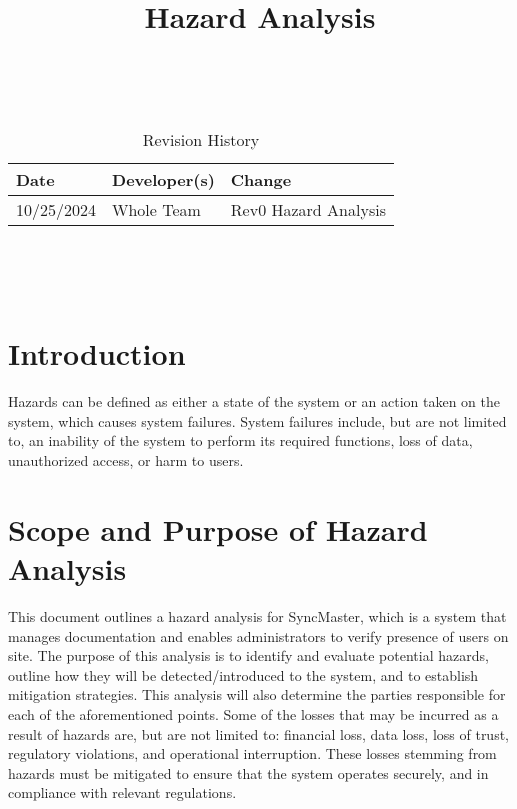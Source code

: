 \documentclass{article}
\title{Hazard Analysis\\\progname}
\author{\authname}
\date{}
\begin{document}
\maketitle
\thispagestyle{empty}

~\newpage


\begin{table}[hp]
  \caption{Revision History} \label{TblRevisionHistory}
  \begin{tabularx}{\textwidth}{llX}
    \toprule
    \textbf{Date} & \textbf{Developer(s)} & \textbf{Change}\\
    \midrule
    10/25/2024 & Whole Team & Rev0 Hazard Analysis\\
    \bottomrule
  \end{tabularx}
\end{table}

~\newpage

\tableofcontents

\listoftables

~\newpage


\section{Introduction}

Hazards can be defined as either a state of the system or an action
taken on the system, which causes system failures. System failures
include, but are not limited to, an inability of the system to
perform its required functions, loss of data, unauthorized access,
or harm to users.

\section{Scope and Purpose of Hazard Analysis}

This document outlines a hazard analysis for SyncMaster, which is a system that
manages documentation and enables administrators to verify presence of users on
site. The purpose of this analysis is to identify and evaluate potential
hazards, outline how they will be detected/introduced to the system, and to
establish mitigation strategies. This analysis will also determine
the parties responsible
for each of the aforementioned points. Some of the losses that
may be incurred as a result of hazards are, but are not limited to:
financial loss, data loss, loss of trust, regulatory violations, and
operational interruption. These losses stemming from hazards must be mitigated
to ensure that the system operates securely, and in compliance with relevant
regulations.
\end{document}
